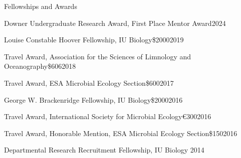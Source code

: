 \documentclass{resume} %
\begin{document}
\begin{rSection}{Fellowships and Awards}

\begin{Award}{Downer Undergraduate Research Award, First Place Mentor Award}{}{2024}
\end{Award}

\begin{Award}{Louise Constable Hoover Fellowship, IU Biology}{\$2000}{2019}
\end{Award}

\begin{Award}{Travel Award, Association for the Sciences of Limnology and Oceanography}{\$606}{2018}
\end{Award}

\begin{Award}{Travel Award, ESA Microbial Ecology Section}{\$600}{2017}
\end{Award}

\begin{Award}{George W. Brackenridge Fellowship, IU Biology}{\$2000}{2016}
\end{Award}

\begin{Award}{Travel Award, International Society for Microbial Ecology}{\euro{}300}{2016}
\end{Award}

\begin{Award}{Travel Award, Honorable Mention, ESA Microbial Ecology Section}{\$150}{2016}
\end{Award}

\begin{Award}{Departmental Research Recruitment Fellowship, IU Biology}{ }{2014}
\end{Award}

\end{rSection}
\end{document}
